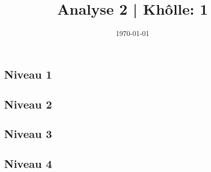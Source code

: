 \documentclass[a4paper, 12pt]{article}
\title{Analyse 2 | Khôlle: 1}
\date{\today}
\begin{document}
\maketitle

\subsection*{Niveau 1}

\subsection*{Niveau 2}
\subsection*{Niveau 3}
\subsection*{Niveau 4}
\end{document}

